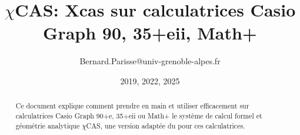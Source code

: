 \documentclass{article}
\begin{document}
\title{$\chi$CAS: Xcas sur calculatrices Casio Graph 90, 35+eii, Math+}
\author{Bernard.Parisse@univ-grenoble-alpes.fr}
\date{2019, 2022, 2025}

\begin{giacjshere}

\maketitle



\tableofcontents


\begin{abstract}
Ce document explique comment prendre en main et utiliser efficacement
sur calculatrices Casio Graph 90+e, 35+eii ou Math+
le syst\`eme de calcul formel et géométrie analytique
$\chi$CAS, une version adapt\'ee
du  pour ces calculatrices.


\end{abstract}
\end{giacjshere}
\end{document}
